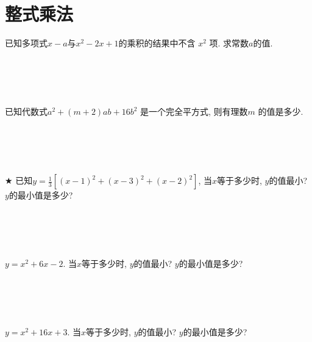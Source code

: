 \section{整式乘法}




\item {
    已知多项式$x-a$与$x^2 - 2x + 1$的乘积的结果中不含 $x^2$ 项. 求常数$a$的值. 
    \ifshowSolution
        \fangsong{}
        \\
    \else
        \\ \\ \\ \\ 
    \fi
}

\item {
    已知代数式$a^2 + (m+2)ab+ 16b^2$ 是一个完全平方式, 则有理数$m$ 的值是多少. 
    \ifshowSolution
        \fangsong{}
        \\
    \else
        \\ \\ \\ \\ 
    \fi
}

\item {
    $\bigstar$
    已知$y=\frac13 [(x - 1)^2 + (x - 3)^2 + (x - 2)^2]$, 当$x$等于多少时, $y$的值最小? $y$的最小值是多少? 
    \ifshowSolution
        \fangsong{}
        \\
    \else
        \\ \\ \\ \\ 
    \fi
}

\item {
    $y=x^2 + 6x - 2$. 当$x$等于多少时, $y$的值最小? $y$的最小值是多少? 
    \ifshowSolution
        \fangsong{}
        \\
    \else
        \\ \\ \\ \\ 
    \fi
}

\item {
    $y=x^2 + 16x + 3$. 当$x$等于多少时, $y$的值最小? $y$的最小值是多少? 
    \ifshowSolution
        \fangsong{}
        \\
    \else
        \\ \\ \\ \\ 
    \fi
}


